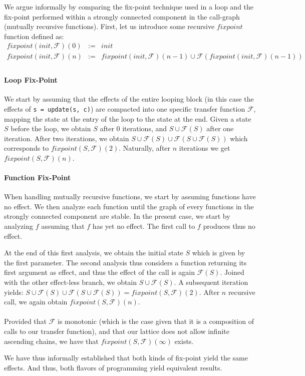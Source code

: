 We argue informally by comparing the fix-point technique used in a loop and the
fix-point performed within a strongly connected component in the call-graph
(mutually recursive functions). First, let us introduce some recursive
$fixpoint$ function defined as:
\begin{eqnarray*}
    fixpoint(init, \mathcal{F})(0) &:=& init \\
    fixpoint(init, \mathcal{F})(n) &:=& fixpoint(init, \mathcal{F})(n-1) \cup \mathcal{F}(fixpoint(init, \mathcal{F})(n-1)) \\
\end{eqnarray*}

\paragraph{Loop Fix-Point}
We start by assuming that the effects of the entire looping block (in this case
the effects of \verb/s = update(s, c)/) are compacted into one specific
transfer function $\mathcal{F}$, mapping the state at the entry of the loop to
the state at the end. Given a state $S$ before the loop, we obtain $S$ after 0
iterations, and $S \cup \mathcal{F}(S)$ after one iteration. After two
iterations, we obtain $S \cup \mathcal{F}(S) \cup \mathcal{F}(S \cup
\mathcal{F}(S))$ which corresponds to $fixpoint(S, \mathcal{F})(2)$. Naturally,
after $n$ iterations we get $fixpoint(S, \mathcal{F})(n)$.

\paragraph{Function Fix-Point}
When handling mutually recursive functions, we start by assuming functions have
no effect. We then analyze each function until the graph of every functions in
the strongly connected component are stable. In the present case, we start by
analyzing $f$ assuming that $f$ has yet no effect. The first call to $f$
produces thus no effect.

At the end of this first analysis, we obtain the initial state $S$ which is
given by the first parameter. The second analysis thus considers a function
returning its first argument as effect, and thus the effect of the call is
again $\mathcal{F}(S)$. Joined with the other effect-less branch, we obtain $S
\cup \mathcal{F}(S)$. A subsequent iteration yields: $S \cup \mathcal{F}(S)
\cup \mathcal{F}(S \cup \mathcal{F}(S)) = fixpoint(S, \mathcal{F})(2)$. After
$n$ recursive call, we again obtain $fixpoint(S, \mathcal{F})(n)$.

\paragraph{}
Provided that $\mathcal{F}$ is monotonic (which is the case given that it is
a composition of calls to our transfer function), and that our lattice does not
allow infinite ascending chains, we have that $fixpoint(S, \mathcal{F})(\infty)$
exists.

We have thus informally established that both kinds of fix-point yield the
same effects. And thus, both flavors of programming yield equivalent
results.
